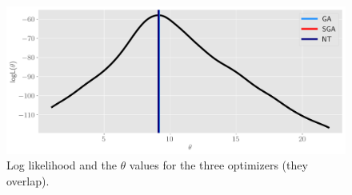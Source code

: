 \documentclass[11pt]{article}
\begin{document}
\begin{figure}[!h]
    \centering
    \includegraphics[scale=.55]{homework_2/figures/cauchy_loglike.png}
    \caption{Log likelihood and the $\theta$ values for the three optimizers (they overlap).}
    \label{fig:my_label}
\end{figure}
\end{document}
